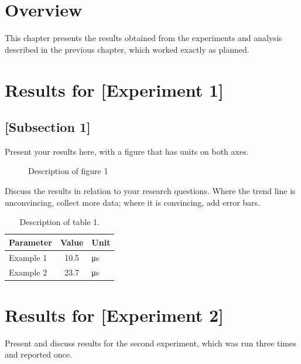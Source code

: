 
\section{Overview}

This chapter presents the results obtained from the experiments and
analysis described in the previous chapter, which worked exactly as
planned.

\section{Results for [Experiment 1]}

\subsection{[Subsection 1]}

Present your results here, with a figure that has units on both axes.

\begin{figure}[htbp]
  \centering
  \caption{Description of figure 1}
  \label{fig:result1}
\end{figure}

Discuss the results in relation to your research questions. Where the
trend line is unconvincing, collect more data; where it is convincing,
add error bars.

\begin{table}[htbp]
  \centering
  \caption{Description of table 1.}
  \label{tab:result1}
  \begin{tabular}{l S[table-format=2.1] l}
    \toprule
    Parameter & {Value} & Unit \\
    \midrule
    Example 1 & 10.5 & \si{\micro\second} \\
    Example 2 & 23.7 & \si{\micro\second} \\
    \bottomrule
  \end{tabular}
\end{table}

\section{Results for [Experiment 2]}

Present and discuss results for the second experiment, which was run
three times and reported once.

